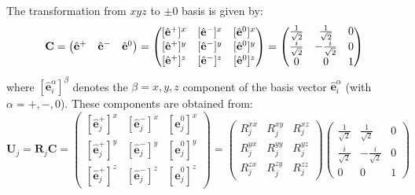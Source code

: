 The transformation from $xyz$ to $\pm0$ basis is given by:
\begin{equation}
    \mathbf{C} = 
    \begin{pmatrix}
        \hat{\bf e}^{+} & \hat{\bf e}^{-} & \hat{\bf e}^{0}
    \end{pmatrix}
    = 
    \begin{pmatrix}
        [\hat{\mathbf{e}}^{+}]^{x} & [\hat{\mathbf{e}}^{-}]^{x} & [\hat{\mathbf{e}}^{0}]^{x} \\[0.1em]
        [\hat{\mathbf{e}}^{+}]^{y} & [\hat{\mathbf{e}}^{-}]^{y} & [\hat{\mathbf{e}}^{0}]^{y} \\[0.1em]
        [\hat{\mathbf{e}}^{+}]^{z} & [\hat{\mathbf{e}}^{-}]^{z} & [\hat{\mathbf{e}}^{0}]^{z} 
    \end{pmatrix}
    = 
    \begin{pmatrix}
        \frac{1}{\sqrt{2}}  &   \frac{1}{\sqrt{2}}  &   0   \\[0.1em]
        \frac{i}{\sqrt{2}}  & - \frac{i}{\sqrt{2}}  &   0   \\[0.1em]
                    0       &           0           &   1   
    \end{pmatrix} 
\end{equation}
where $[\hat{\mathbf{e}}_{i}^{\alpha}]^{\beta}$ denotes the $\beta = x, y, z$ component of the basis vector $\hat{\mathbf{e}}_{i}^{\alpha}$ (with $\alpha = +, -, 0$). 
These components are obtained from:
\begin{equation}
    \mathbf{U}_{j} = \mathbf{R}_{j} \mathbf{C} =
    \begin{pmatrix}
        [\hat{\mathbf{e}}_{j}^{+}]^{x} & [\hat{\mathbf{e}}_{j}^{-}]^{x} & [\hat{\mathbf{e}}_{j}^{0}]^{x} \\[0.25em]
        [\hat{\mathbf{e}}_{j}^{+}]^{y} & [\hat{\mathbf{e}}_{j}^{-}]^{y} & [\hat{\mathbf{e}}_{j}^{0}]^{y} \\[0.25em]
        [\hat{\mathbf{e}}_{j}^{+}]^{z} & [\hat{\mathbf{e}}_{j}^{-}]^{z} & [\hat{\mathbf{e}}_{j}^{0}]^{z} 
    \end{pmatrix}
    = 
    \begin{pmatrix}
        R^{xx}_{j}   &   R^{xy}_{j}   &   R^{xz}_{j}   \\[0.25em]
        R^{yx}_{j}   &   R^{yy}_{j}   &   R^{yz}_{j}   \\[0.25em]
        R^{zx}_{j}   &   R^{zy}_{j}   &   R^{zz}_{j}   
    \end{pmatrix}
    \begin{pmatrix}
        \frac{1}{\sqrt{2}}   &   \frac{1}{\sqrt{2}}   &   0   \\[0.25em]
        \frac{i}{\sqrt{2}}   & - \frac{i}{\sqrt{2}}   &   0   \\[0.25em]
                0     &         0       &   1   
    \end{pmatrix} 
\end{equation}

